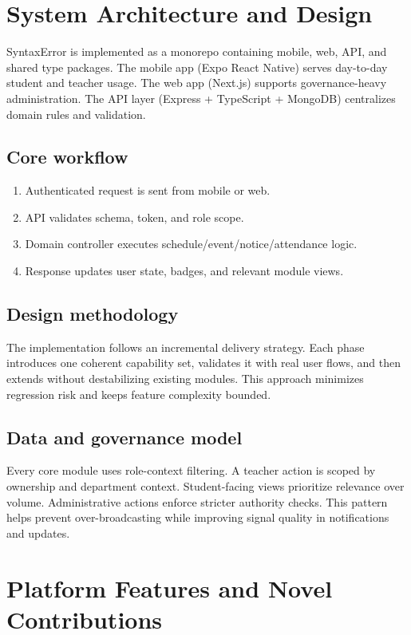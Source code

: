 \documentclass[conference]{IEEEtran}
\begin{document}
\section{System Architecture and Design}
SyntaxError is implemented as a monorepo containing mobile, web, API, and shared type packages. The mobile app (Expo React Native) serves day-to-day student and teacher usage. The web app (Next.js) supports governance-heavy administration. The API layer (Express + TypeScript + MongoDB) centralizes domain rules and validation.

\subsection{Core workflow}
\begin{enumerate}
    \item Authenticated request is sent from mobile or web.
    \item API validates schema, token, and role scope.
    \item Domain controller executes schedule/event/notice/attendance logic.
    \item Response updates user state, badges, and relevant module views.
\end{enumerate}

\subsection{Design methodology}
The implementation follows an incremental delivery strategy. Each phase introduces one coherent capability set, validates it with real user flows, and then extends without destabilizing existing modules. This approach minimizes regression risk and keeps feature complexity bounded.

\subsection{Data and governance model}
Every core module uses role-context filtering. A teacher action is scoped by ownership and department context. Student-facing views prioritize relevance over volume. Administrative actions enforce stricter authority checks. This pattern helps prevent over-broadcasting while improving signal quality in notifications and updates.

\section{Platform Features and Novel Contributions}
\end{document}
